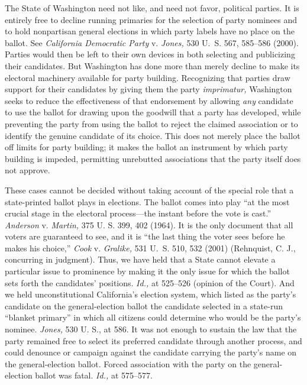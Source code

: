   The State of Washington need not like, and need not favor, political
parties. It is entirely free to decline running primaries for the
selection of party nominees and to hold nonpartisan general elections
in which party labels have no place on the ballot. See \emph{California
Democratic Party} v. \emph{Jones,} 530 U.~S. 567, 585--586 (2000).
Parties would then be left to their own devices in both selecting and
publicizing their candidates. But Washington has done more than merely
decline to make its electoral machinery available for party building.
Recognizing that parties draw support for their candidates by giving
them the party \emph{imprimatur,} Washing\newpage ton seeks to reduce the
effectiveness of that endorsement by allowing \emph{any} candidate to use
the ballot for drawing upon the goodwill that a party has developed,
while preventing the party from using the ballot to reject the claimed
association or to identify the genuine candidate of its choice. This
does not merely place the ballot off limits for party building; it makes
the ballot an instrument by which party building is impeded, permitting
unrebutted associations that the party itself does not approve.

  These cases cannot be decided without taking account of the special
role that a state-printed ballot plays in elections. The ballot comes
into play ``at the most crucial stage in the electoral process---the
instant before the vote is cast.'' \emph{Anderson} v. \emph{Martin,} 375
U. S. 399, 402 (1964). It is the only document that all voters are
guaranteed to see, and it is ``the last thing the voter sees before
he makes his choice,'' \emph{Cook} v. \emph{Gralike,} 531 U.~S. 510, 532
(2001) (Rehnquist, C. J., concurring in judgment). Thus, we have held
that a State cannot elevate a particular issue to prominence by making
it the only issue for which the ballot sets forth the candidates'
positions. \emph{Id.,} at 525--526 (opinion of the Court). And we
held unconstitutional California's election system, which listed as
the party's candidate on the general-election ballot the candidate
selected in a state-run ``blanket primary'' in which all citizens
could determine who would be the party's nominee. \emph{Jones,} 530
U. S., at 586. It was not enough to sustain the law that the party
remained free to select its preferred candidate through another process,
and could denounce or campaign against the candidate carrying the
party's name on the general-election ballot. Forced association with
the party on the general-election ballot was fatal. \emph{Id.,} at
575--577.

